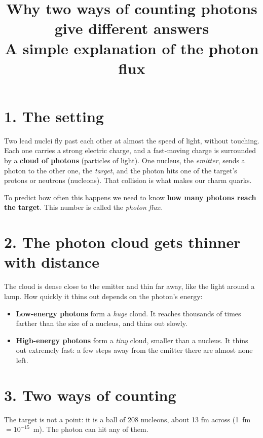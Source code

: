 \documentclass[12pt]{article}
\title{Why two ways of counting photons give different answers\\
\large A simple explanation of the photon flux}
\author{}
\date{}
\begin{document}
\maketitle

\section*{1. The setting}

Two lead nuclei fly past each other at almost the speed of light, without touching. Each one
carries a strong electric charge, and a fast-moving charge is surrounded by a \textbf{cloud of
photons} (particles of light). One nucleus, the \emph{emitter}, sends a photon to the other one,
the \emph{target}, and the photon hits one of the target's protons or neutrons (nucleons). That
collision is what makes our charm quarks.

To predict how often this happens we need to know \textbf{how many photons reach the target}.
This number is called the \emph{photon flux}.

\section*{2. The photon cloud gets thinner with distance}

The cloud is dense close to the emitter and thin far away, like the light around a lamp. How
quickly it thins out depends on the photon's energy:
\begin{itemize}
\item \textbf{Low-energy photons} form a \emph{huge} cloud. It reaches thousands of times
  farther than the size of a nucleus, and thins out slowly.
\item \textbf{High-energy photons} form a \emph{tiny} cloud, smaller than a nucleus. It thins out
  extremely fast: a few steps away from the emitter there are almost none left.
\end{itemize}

\section*{3. Two ways of counting}

The target is not a point: it is a ball of 208 nucleons, about 13 fm across
(1~fm $=10^{-15}$~m). The photon can hit any of them.

\begin{center}
\end{center}
\end{document}
